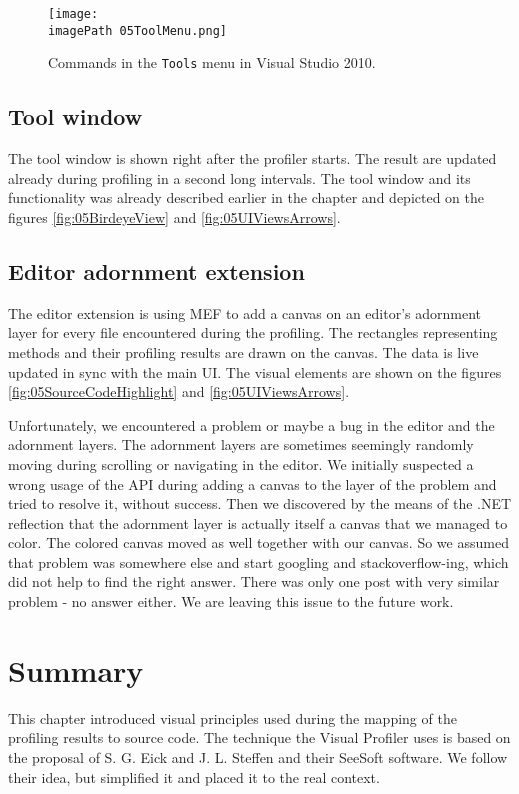  \begin{figure}
	\centering
		\texttt{[image: \\imagePath 05ToolMenu.png]}
		\caption{Commands in the \texttt{Tools} menu in Visual Studio 2010. }
	\label{fig:05ToolMenu}
\end{figure}

\subsection{Tool window}
The tool window is shown right after the profiler starts. The result are updated already during profiling in a second long intervals. The tool window and its functionality was already described earlier in the chapter and depicted on the figures \ref{fig:05BirdeyeView} and \ref{fig:05UIViewsArrows}.

\subsection{Editor adornment extension}
\label{sec:06EditorAdorExt}
The editor extension is using MEF to add a canvas on an editor's adornment layer for every file encountered during the profiling. The rectangles representing methods and their profiling results are drawn on the canvas. The data is live updated in sync with the main UI. The visual elements are shown on the figures \ref{fig:05SourceCodeHighlight} and \ref{fig:05UIViewsArrows}.

Unfortunately, we encountered a problem or maybe a bug in the editor and the adornment layers. The adornment layers are sometimes seemingly randomly moving during scrolling or navigating in the editor. We initially suspected a wrong usage of the API during adding a canvas to the layer of the problem and tried to resolve it, without success. Then we discovered by the means of the .NET reflection that the adornment layer is actually itself a canvas that we managed to color. The colored canvas moved as well together with our canvas. So we assumed that problem was somewhere else and start googling and stackoverflow-ing, which did not help to find the right answer. There was only one post with very similar problem - no answer either. We are leaving this issue to the future work.

\section{Summary}
This chapter introduced visual principles used during the mapping of the profiling results to source code. The technique the Visual Profiler uses is based on the proposal of S. G. Eick and J. L. Steffen and their SeeSoft software. We follow their idea, but simplified it and placed it to the real context.

